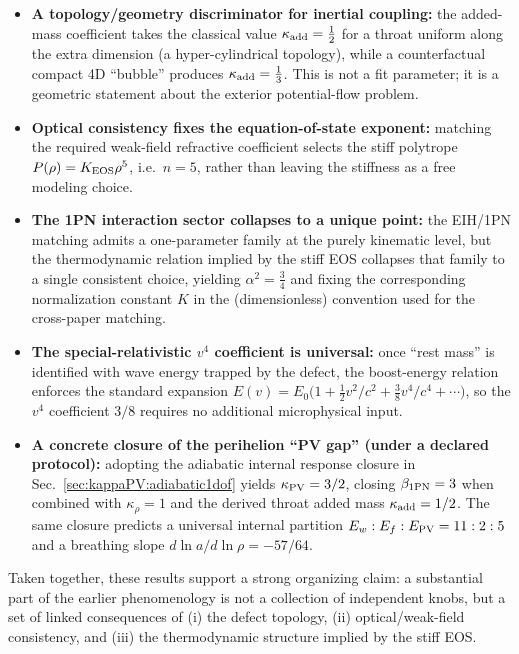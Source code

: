 \documentclass[11pt]{article}
\begin{document}
\begin{itemize}
  \item \textbf{A topology/geometry discriminator for inertial coupling:}
  the added-mass coefficient takes the classical value
  \(
    \kappa_{\rm add}=\tfrac12
  \)
  for a throat uniform along the extra dimension (a hyper-cylindrical topology),
  while a counterfactual compact 4D ``bubble'' produces
  \(
    \kappa_{\rm add}=\tfrac13
  \).
  This is not a fit parameter; it is a geometric statement about the exterior potential-flow problem.

  \item \textbf{Optical consistency fixes the equation-of-state exponent:}
  matching the required weak-field refractive coefficient selects the stiff polytrope
  \(
    P(\rho)=K_{\rm EOS}\rho^5
  \),
  i.e.\ \(n=5\), rather than leaving the stiffness as a free modeling choice.

  \item \textbf{The 1PN interaction sector collapses to a unique point:}
  the EIH/1PN matching admits a one-parameter family at the purely kinematic level, but the thermodynamic relation implied by the stiff EOS collapses that family to a single consistent choice,
  yielding
  \(
    \alpha^2=\tfrac34
  \)
  and fixing the corresponding normalization constant \(K\) in the (dimensionless) convention used for the cross-paper matching.

  \item \textbf{The special-relativistic $v^4$ coefficient is universal:}
  once ``rest mass'' is identified with wave energy trapped by the defect, the boost-energy relation enforces the standard expansion
  \(
    E(v)=E_0\big(1+\tfrac12 v^2/c^2+\tfrac{3}{8}v^4/c^4+\cdots\big)
  \),
  so the \(v^4\) coefficient \(3/8\) requires no additional microphysical input.

  \item \textbf{A concrete closure of the perihelion ``PV gap'' (under a declared protocol):}
  adopting the adiabatic internal response closure in Sec.~\ref{sec:kappaPV:adiabatic1dof} yields
  \(\kappa_{\rm PV}=3/2\), closing \(\beta_{\rm 1PN}=3\) when combined with \(\kappa_\rho=1\) and the derived
  throat added mass \(\kappa_{\rm add}=1/2\). The same closure predicts a universal internal partition
  \(E_w:E_f:E_{\rm PV}=11:2:5\) and a breathing slope \(d\ln a/d\ln\rho=-57/64\).
\end{itemize}

Taken together, these results support a strong organizing claim: a substantial part of the earlier phenomenology is not a collection of independent knobs, but a set of linked consequences of (i) the defect topology, (ii) optical/weak-field consistency, and (iii) the thermodynamic structure implied by the stiff EOS.
\end{document}
